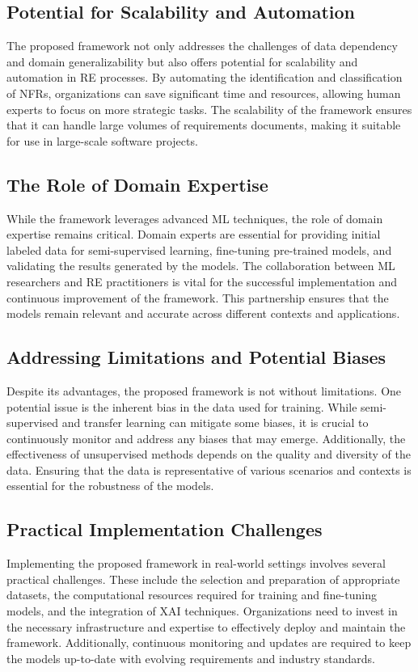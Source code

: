 \documentclass[sigconf,natbib=false]{acmart}
\begin{document}
\subsection{Potential for Scalability and Automation}
The proposed framework not only addresses the challenges of data dependency and domain generalizability but also offers potential for scalability and automation in RE processes. By automating the identification and classification of NFRs, organizations can save significant time and resources, allowing human experts to focus on more strategic tasks. The scalability of the framework ensures that it can handle large volumes of requirements documents, making it suitable for use in large-scale software projects.

\subsection{The Role of Domain Expertise}
While the framework leverages advanced ML techniques, the role of domain expertise remains critical. Domain experts are essential for providing initial labeled data for semi-supervised learning, fine-tuning pre-trained models, and validating the results generated by the models. The collaboration between ML researchers and RE practitioners is vital for the successful implementation and continuous improvement of the framework. This partnership ensures that the models remain relevant and accurate across different contexts and applications.

\subsection{Addressing Limitations and Potential Biases}
Despite its advantages, the proposed framework is not without limitations. One potential issue is the inherent bias in the data used for training. While semi-supervised and transfer learning can mitigate some biases, it is crucial to continuously monitor and address any biases that may emerge. Additionally, the effectiveness of unsupervised methods depends on the quality and diversity of the data. Ensuring that the data is representative of various scenarios and contexts is essential for the robustness of the models.

\subsection{Practical Implementation Challenges}
Implementing the proposed framework in real-world settings involves several practical challenges. These include the selection and preparation of appropriate datasets, the computational resources required for training and fine-tuning models, and the integration of XAI techniques. Organizations need to invest in the necessary infrastructure and expertise to effectively deploy and maintain the framework. Additionally, continuous monitoring and updates are required to keep the models up-to-date with evolving requirements and industry standards.
\end{document}
